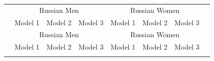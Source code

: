 \documentclass[12pt, a4paper]{article}
\begin{document}
\clearpage

	\begin{longtable}{l*{3}{c}|l*{3}{c}}
		\toprule
				& \multicolumn{3}{c|}{Russian Men} & \multicolumn{3}{c}{Russian Women} \\
				&\multicolumn{1}{c}{Model 1}&\multicolumn{1}{c}{Model 2}&\multicolumn{1}{c|}{Model 3}&\multicolumn{1}{c}{Model 1}&\multicolumn{1}{c}{Model 2}&\multicolumn{1}{c}{Model 3}\\
						\midrule
		\endfirsthead
		\toprule
						& \multicolumn{3}{c|}{Russian Men} & \multicolumn{3}{c}{Russian Women} \\
				&\multicolumn{1}{c}{Model 1}&\multicolumn{1}{c}{Model 2}&\multicolumn{1}{c|}{Model 3}&\multicolumn{1}{c}{Model 1}&\multicolumn{1}{c}{Model 2}&\multicolumn{1}{c}{Model 3}\\
						\midrule
		\endhead
		\midrule
		\endfoot
		\bottomrule
		\endlastfoot



\end{longtable}
\end{document}
